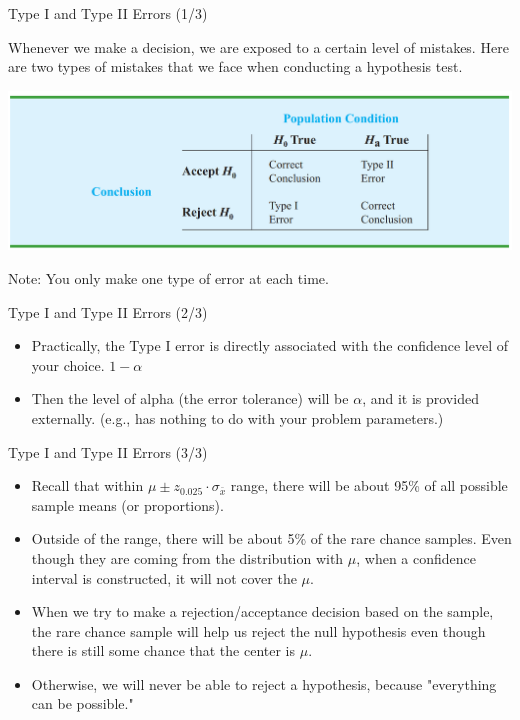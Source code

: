 \documentclass{beamer}
\begin{document}
\begin{frame}{Type I and Type II Errors (1/3)} 

Whenever we make a decision, we are exposed to a certain level of mistakes. Here are two types of mistakes that we face when conducting a hypothesis test. 


\begin{center}
\includegraphics[scale=0.4]{images/TypeITypeIIErrors.png}
\end{center}

Note: You only make one type of error at each time. 

\end{frame}


\begin{frame}{Type I and Type II Errors (2/3)} 

\begin{itemize}
\item Practically, the Type I error is directly associated with the confidence level of your choice. $1 - \alpha$

\item Then the level of alpha (the error tolerance) will be $\alpha$, and it is provided externally. (e.g., has nothing to do with your problem parameters.)

\end{itemize}

\end{frame}


\begin{frame}{Type I and Type II Errors (3/3)} 

\begin{itemize}
\item Recall that within $\mu \pm z_{0.025} \cdot \sigma_{\bar{x}}$ range, there will be about 95\% of all possible sample means (or proportions).

\item Outside of the range, there will be about 5\% of the rare chance samples. Even though they are coming from the distribution with $\mu$, when a confidence interval is constructed, it will not cover the $\mu$.

\item When we try to make a rejection/acceptance decision based on the sample, the rare chance sample will help us reject the null hypothesis even though there is still some chance that the center is $\mu$.
\item Otherwise, we will never be able to reject a hypothesis, because "everything can be possible."
\end{itemize}

\end{frame}
\end{document}
